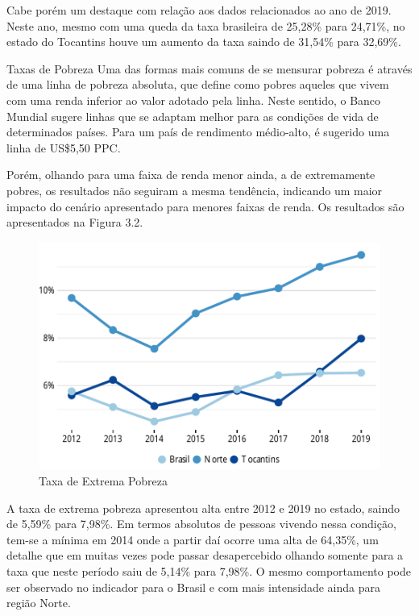 \par Cabe porém um destaque com relação aos dados relacionados ao ano de 2019. Neste ano, mesmo com uma queda da taxa brasileira de 25,28\% para 24,71\%, no estado do Tocantins houve um aumento da taxa saindo de 31,54\% para 32,69\%.

\begin{smbox}[label={labelbox},nameref={Taxas de Pobreza}]{Taxas de Pobreza}
	Uma das formas mais comuns de se mensurar pobreza é através de uma linha de pobreza absoluta, que define como pobres aqueles que vivem com uma renda inferior ao valor adotado pela linha. Neste sentido, o Banco Mundial sugere linhas que se adaptam melhor para as condições de vida de determinados países. Para um país de rendimento médio-alto, é sugerido uma linha de US\$5,50 PPC.  
\end{smbox}
\par Porém, olhando para uma faixa de renda menor ainda, a de extremamente pobres, os resultados não seguiram a mesma tendência, indicando um maior impacto do cenário apresentado para menores faixas de renda. Os resultados são apresentados na Figura 3.2.
\begin{figure}[h]
	\caption{Taxa de Extrema Pobreza}
	\includegraphics{fig/taxa_expobreza.pdf}
\end{figure}
\par A taxa de extrema pobreza apresentou alta entre 2012 e 2019 no estado, saindo de 5,59\% para 7,98\%. Em termos absolutos de pessoas vivendo nessa condição, tem-se a mínima em 2014 onde a partir daí ocorre uma alta de 64,35\%, um detalhe que em muitas vezes pode passar desapercebido olhando somente para a taxa que neste período saiu de 5,14\% para 7,98\%. O mesmo comportamento pode ser observado no indicador para o Brasil e  com mais intensidade ainda para região Norte.
